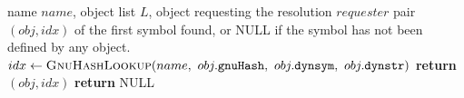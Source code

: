 \begin{algorithm}
    \end{algorithm}
    \begin{algorithm}
        \caption{\textsc{ResolveSymbol} function used by \cref{alg:relocation_resolution}}
        \label{alg:symbol_resolution}
        \begin{algorithmic}[1]
            \REQUIRE name $name$, object list $L$, object requesting the resolution $requester$
            \ENSURE pair $(obj, idx)$ of the first symbol found, or NULL if the symbol has not been defined by any object.
                \STATE $idx \gets \textsc{GnuHashLookup}(name,\ obj.\texttt{gnuHash},\ obj.\texttt{dynsym},\ obj.\texttt{dynstr})$
                \COMMENT{\small \textcolor{green!60!black}{As seen before, the hashes are used in order to speed up the symbol lookup}}
                    \STATE \textbf{return} $(obj, idx)$ 
                \ENDIF
            \ENDFOR
            \STATE \textbf{return} NULL
        \end{algorithmic}
    \end{algorithm}